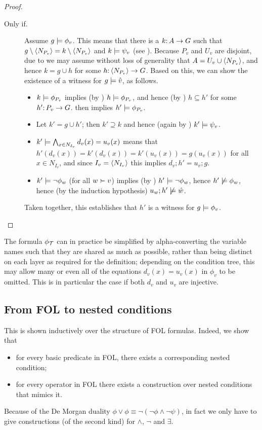 \begin{proof}
\begin{description}
\smallskip
\item[Only if.] Assume $g\models \phi_v$. This means that there is a $k{:}\, A\rightarrow G$ such that $g\setminus \langle N_{P_v}\rangle=k\setminus \langle N_{P_v}\rangle$ and $k\models \psi_v$ (see ). Because $P_v$ and $U_v$ are disjoint, due to  we may assume without loss of generality that $A= U_v\cup\langle N_{P_v}\rangle$, and hence $k=g\cup h$ for some $h{:}\, \langle N_{P_v}\rangle\rightarrow G$. Based on this, we can show the existence of a witness for $g\models \hat v$, as follows.
\begin{itemize}
\item $k\models \phi_{P_v}$ implies (by ) $h\models \phi_{P_v}$, and hence (by ) $h\subseteq h'$ for some $h'{:}\, P_v\rightarrow G$.  then implies $h'\models \phi_{P_v}$.

\item Let $k'=g\cup h'$; then $k'\supseteq k$ and hence (again by ) $k'\models \psi_v$.

\item $k'\models \bigwedge_{x\in N_{I_v}} d_v(x)=u_v(x)$ means that $h'(d_v(x))=k'(d_v(x))=k'(u_v(x))=g(u_v(x))$ for all $x\in N_{I_v}$, and since $I_v=\langle N_{I_v}\rangle$ this implies $d_v;h'=u_v;g$.

\item $k'\models \neg\phi_w$ (for all $w\childof v$) implies (by ) $h'\models\neg\phi_w$, hence $h'\not\models\phi_w$, hence (by the induction hypothesis) $u_w;h'\not\models \hat w$.
\end{itemize}

Taken together, this establishes that $h'$ is a witness for  $g\models \phi_v$.
\end{description}
\end{proof}
%
The formula $\phi_{\mathcal{T}}$ can in practice be simplified by alpha-converting the variable names such that they are shared as much as possible, rather than being distinct on each layer as required for the definition; depending on the condition tree, this may allow many or even all of the equations $d_v(x)=u_v(x)$ in $\phi_v$ to be omitted. This is in particular the case if both $d_v$ and $u_v$ are injective.

\subsection{From FOL to nested conditions}

This is shown inductively over the structure of FOL formulas. Indeed, we show that
\begin{itemize}
\item for every basic predicate in FOL, there exists a corresponding nested condition;
\item for every operator in FOL there exists a construction over nested conditions that mimics it.
\end{itemize}
%
Because of the De Morgan duality $\phi\vee \phi\equiv \neg(\neg\phi\wedge \neg\psi)$, in fact we only have to give constructions (of the second kind) for $\wedge$, $\neg$ and $\exists$.


